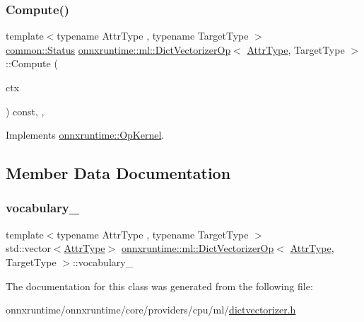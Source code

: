\subsubsection{\texorpdfstring{Compute()}{Compute()}}
{\footnotesize\ttfamily template$<$typename Attr\+Type , typename Target\+Type $>$ \\
\mbox{\hyperlink{classonnxruntime_1_1common_1_1Status}{common\+::\+Status}} \mbox{\hyperlink{classonnxruntime_1_1ml_1_1DictVectorizerOp}{onnxruntime\+::ml\+::\+Dict\+Vectorizer\+Op}}$<$ \mbox{\hyperlink{namespaceonnxruntime_afb993460ae8432beef9db5f0cf10ca7c}{Attr\+Type}}, Target\+Type $>$\+::Compute (\begin{DoxyParamCaption}\item[{\mbox{\hyperlink{classonnxruntime_1_1OpKernelContext}{Op\+Kernel\+Context}} $\ast$}]{ctx }\end{DoxyParamCaption}) const\hspace{0.3cm}{\ttfamily [inline]}, {\ttfamily [override]}, {\ttfamily [virtual]}}



Implements \mbox{\hyperlink{classonnxruntime_1_1OpKernel_a9eca8656a78b1b3ab9d3351a12798650}{onnxruntime\+::\+Op\+Kernel}}.



\subsection{Member Data Documentation}
\mbox{\label{classonnxruntime_1_1ml_1_1DictVectorizerOp_a2d5f881e36174f00790e9b3f16cc20b2}} 
\subsubsection{\texorpdfstring{vocabulary\+\_\+}{vocabulary\_}}
{\footnotesize\ttfamily template$<$typename Attr\+Type , typename Target\+Type $>$ \\
std\+::vector$<$\mbox{\hyperlink{namespaceonnxruntime_afb993460ae8432beef9db5f0cf10ca7c}{Attr\+Type}}$>$ \mbox{\hyperlink{classonnxruntime_1_1ml_1_1DictVectorizerOp}{onnxruntime\+::ml\+::\+Dict\+Vectorizer\+Op}}$<$ \mbox{\hyperlink{namespaceonnxruntime_afb993460ae8432beef9db5f0cf10ca7c}{Attr\+Type}}, Target\+Type $>$\+::vocabulary\+\_\+}



The documentation for this class was generated from the following file\+:\begin{DoxyCompactItemize}
\item 
onnxruntime/onnxruntime/core/providers/cpu/ml/\mbox{\hyperlink{dictvectorizer_8h}{dictvectorizer.\+h}}\end{DoxyCompactItemize}
